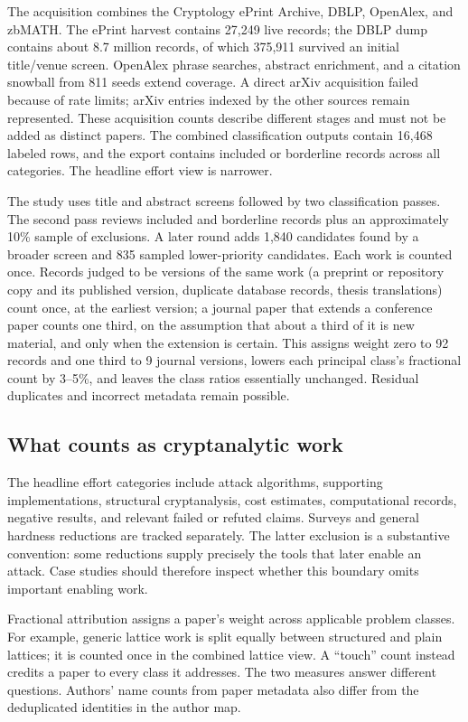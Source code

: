 \documentclass[11pt,letterpaper]{article}
\begin{document}
The acquisition combines the Cryptology ePrint Archive, DBLP, OpenAlex, and zbMATH. The ePrint harvest contains 27,249 live records; the DBLP dump contains about 8.7 million records, of which 375,911 survived an initial title/venue screen. OpenAlex phrase searches, abstract enrichment, and a citation snowball from 811 seeds extend coverage. A direct arXiv acquisition failed because of rate limits; arXiv entries indexed by the other sources remain represented. These acquisition counts describe different stages and must not be added as distinct papers. The combined classification outputs contain 16,468 labeled rows, and the export contains \ExportRows{} included or borderline records across all categories. The headline effort view is narrower.\cite{study}

The study uses title and abstract screens followed by two classification passes. The second pass reviews included and borderline records plus an approximately 10\% sample of exclusions. A later round adds 1,840 candidates found by a broader screen and 835 sampled lower-priority candidates. Each work is counted once. Records judged to be versions of the same work (a preprint or repository copy and its published version, duplicate database records, thesis translations) count once, at the earliest version; a journal paper that extends a conference paper counts one third, on the assumption that about a third of it is new material, and only when the extension is certain. This assigns weight zero to 92 records and one third to 9 journal versions, lowers each principal class's fractional count by 3--5\%, and leaves the class ratios essentially unchanged. Residual duplicates and incorrect metadata remain possible.

\subsection{What counts as cryptanalytic work}
The headline effort categories include attack algorithms, supporting implementations, structural cryptanalysis, cost estimates, computational records, negative results, and relevant failed or refuted claims. Surveys and general hardness reductions are tracked separately. The latter exclusion is a substantive convention: some reductions supply precisely the tools that later enable an attack. Case studies should therefore inspect whether this boundary omits important enabling work.

Fractional attribution assigns a paper's weight across applicable problem classes. For example, generic lattice work is split equally between structured and plain lattices; it is counted once in the combined lattice view. A ``touch'' count instead credits a paper to every class it addresses. The two measures answer different questions. Authors' name counts from paper metadata also differ from the deduplicated identities in the author map.
\end{document}

